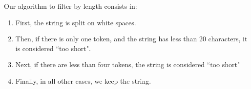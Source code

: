 Our algorithm to filter by length consists in:

\begin{enumerate}
    \item First, the string is split on white spaces.
    \item Then, if there is only one token, and the string has less than 20 characters, it is considered ``too short".
    \item Next, if there are less than four tokens, the string is considered ``too short"
    \item Finally, in all other cases, we keep the string.
\end{enumerate}


\label{vsi_resolving_inconsistencies}





